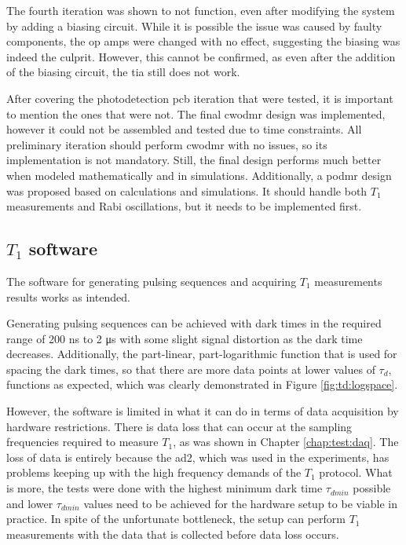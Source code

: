 The fourth iteration was shown to not function, even after modifying the system by adding a biasing circuit. While it is possible the issue was caused by faulty components, the op amps were changed with no effect, suggesting the biasing was indeed the culprit. However, this cannot be confirmed, as even after the addition of the biasing circuit, the \gls{tia} still does not work.

After covering the photodetection \gls{pcb} iteration that were tested, it is important to mention the ones that were not. The final \gls{cwodmr} design was implemented, however it could not be assembled and tested due to time constraints. All preliminary iteration should perform \gls{cwodmr} with no issues, so its implementation is not mandatory. Still, the final design performs much better when modeled mathematically and in simulations. Additionally, a \gls{podmr} design was proposed based on calculations and simulations. It should handle both $T_1$ measurements and Rabi oscillations, but it needs to be implemented first.

\subsection{$T_1$ software}
The software for generating pulsing sequences and acquiring $T_1$ measurements results works as intended. 

Generating pulsing sequences can be achieved with dark times in the required range of 200 \unit{\nano\second} to 2 \unit{\micro\second} with some slight signal distortion as the dark time decreases. Additionally, the part-linear, part-logarithmic function that is used for spacing the dark times, so that there are more data points at lower values of $\tau_{d}$, functions as expected, which was clearly demonstrated in Figure \ref{fig:td:logspace}.

However, the software is limited in what it can do in terms of data acquisition by hardware restrictions. There is data loss that can occur at the sampling frequencies required to measure $T_1$, as was shown in Chapter \ref{chap:test:daq}. The loss of data is entirely because the \gls{ad2}, which was used in the experiments, has problems keeping up with the high frequency demands of the $T_1$ protocol. What is more, the tests were done with the highest minimum dark time $\tau_{dmin}$ possible and lower $\tau_{dmin}$ values need to be achieved for the hardware setup to be viable in practice. In spite of the unfortunate bottleneck, the setup can perform $T_1$ measurements with the data that is collected before data loss occurs. 


